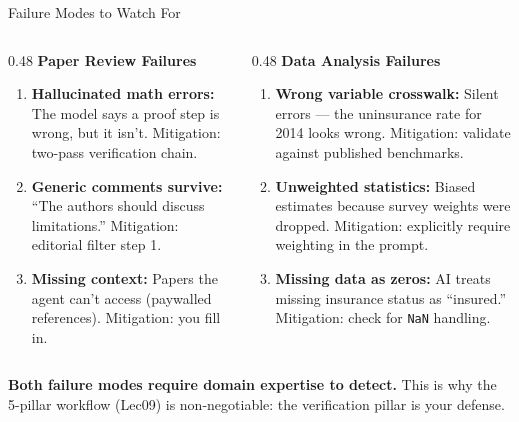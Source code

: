 \documentclass[10pt,english,aspectratio=169]{beamer}
\begin{document}
\begin{frame}{Failure Modes to Watch For}

\begin{columns}[T]
\begin{column}{0.48\textwidth}
\textbf{Paper Review Failures}
\begin{enumerate}
    \item \textbf{Hallucinated math errors:} The model says a proof step is wrong, but it isn't. Mitigation: two-pass verification chain.

    \vspace{0.1cm}
    \item \textbf{Generic comments survive:} ``The authors should discuss limitations.'' Mitigation: editorial filter step 1.

    \vspace{0.1cm}
    \item \textbf{Missing context:} Papers the agent can't access (paywalled references). Mitigation: you fill in.
\end{enumerate}
\end{column}

\begin{column}{0.48\textwidth}
\textbf{Data Analysis Failures}
\begin{enumerate}
    \item \textbf{Wrong variable crosswalk:} Silent errors --- the uninsurance rate for 2014 looks wrong. Mitigation: validate against published benchmarks.

    \vspace{0.1cm}
    \item \textbf{Unweighted statistics:} Biased estimates because survey weights were dropped. Mitigation: explicitly require weighting in the prompt.

    \vspace{0.1cm}
    \item \textbf{Missing data as zeros:} AI treats missing insurance status as ``insured.'' Mitigation: check for \texttt{NaN} handling.
\end{enumerate}
\end{column}
\end{columns}

\vspace{0.3cm}
\textbf{Both failure modes require domain expertise to detect.} This is why the 5-pillar workflow (Lec09) is non-negotiable: the verification pillar is your defense.

\end{frame}
\end{document}
